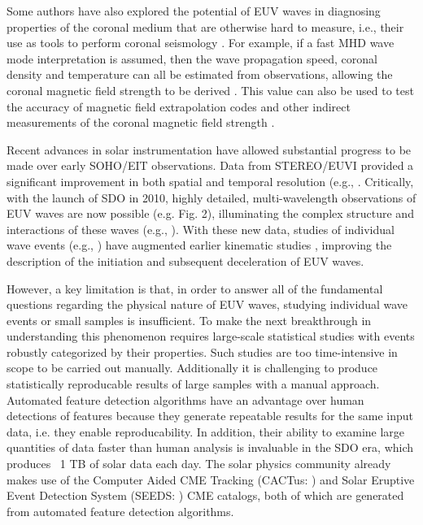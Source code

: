 \documentclass[referee,a4paper,12pt,traditabstract]{swsc}
\begin{document}
\begin{linenumbers}
Some authors have also explored the potential of EUV waves in
diagnosing properties of the coronal medium that are otherwise hard to
measure, i.e., their use as tools to perform coronal seismology
\citep{1970PASJ...22..341U}. For example, if a fast MHD wave mode
interpretation is assumed, then the wave
propagation speed, coronal density and temperature can all be
estimated from observations, allowing the coronal magnetic field
strength to be derived \citep{2005LRSP....2....3N}.  This value can
also be used to test the accuracy of magnetic field extrapolation
codes \citep{2008ApJ...675.1637S} and other indirect measurements of
the coronal magnetic field strength \citep{2007Sci...317.1192T}.


Recent advances in solar instrumentation have allowed substantial
progress to be made over early SOHO/EIT observations. Data from
STEREO/EUVI provided a significant improvement in both spatial and
temporal resolution (e.g., \cite{2008ApJ...680L..81L,
  2008ApJ...681L.113V}.  Critically, with the launch of SDO in 2010,
highly detailed, multi-wavelength observations of EUV waves are now
possible (e.g. Fig. 2), illuminating the complex structure and
interactions of these waves (e.g., \cite{2012ApJ...753...52L}). With
these new data, studies of individual wave events (e.g.,
\cite{2011ApJ...741L..21L}) have augmented earlier kinematic studies
\citep{1999SoPh..190..467W, 2000ApJ...543L..89W}, improving the
description of the initiation and subsequent deceleration of EUV
waves.

However, a key limitation is that, in order to answer all of the
fundamental questions regarding the physical nature of EUV waves,
studying individual wave events or small samples is insufficient. To
make the next breakthrough in understanding this phenomenon requires
large-scale statistical studies with events robustly categorized by
their properties. Such studies are too time-intensive in scope to be
carried out manually. Additionally it is challenging to produce
statistically reproducable results of large samples with a manual
approach. Automated feature detection algorithms have an advantage
over human detections of features because they generate repeatable
results for the same input data, i.e. they enable reproducability. In
addition, their ability to examine large quantities of data faster
than human analysis is invaluable in the SDO era, which produces ~1 TB
of solar data each day. The solar physics community already makes use
of the Computer Aided CME Tracking (CACTus:
\cite{2004A&A...425.1097R}) and Solar Eruptive Event Detection System
(SEEDS: \cite{2008SoPh..248..485O}) CME catalogs, both of which are
generated from automated feature detection algorithms.


\end{linenumbers}
\end{document}
